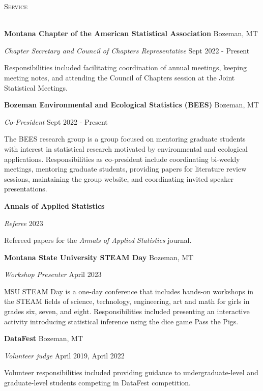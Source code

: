 \documentclass[a4paper]{article}
\newcommand{\lineunder} {
	\vspace*{-8pt} \\
	\hspace*{-18pt} \hrulefill \\
}
\newcommand{\header} [1] {
	{\hspace*{-18pt}\vspace*{6pt} \textcolor{Cerulean}{\textsc{#1}}}
	\vspace*{-6pt} \textcolor{Cerulean}{\lineunder}
}
\begin{document}
\header{Service}

\textbf{Montana Chapter of the American Statistical Association}
\hfill Bozeman, MT

\emph{Chapter Secretary and Council of Chapters Representative}
\hfill Sept 2022 - Present

Responsibilities included facilitating coordination of annual meetings,
keeping meeting notes, and attending the Council of Chapters session at
the Joint Statistical Meetings. \vspace*{2mm}

\textbf{Bozeman Environmental and Ecological Statistics (BEES)}
\hfill Bozeman, MT

\emph{Co-President} \hfill Sept 2022 - Present

The BEES research group is a group focused on mentoring graduate
students with interest in statistical research motivated by
environmental and ecological applications. Responsibilities as
co-president include coordinating bi-weekly meetings, mentoring graduate
students, providing papers for literature review sessions, maintaining
the group website, and coordinating invited speaker presentations.
\vspace*{2mm}

\textbf{Annals of Applied Statistics}

\emph{Referee} \hfill 2023

Refereed papers for the \emph{Annals of Applied Statistics} journal.
\vspace*{2mm}

\textbf{Montana State University STEAM Day} \hfill Bozeman, MT

\emph{Workshop Presenter} \hfill April 2023

MSU STEAM Day is a one-day conference that includes hands-on workshops
in the STEAM fields of science, technology, engineering, art and math
for girls in grades six, seven, and eight. Responsibilities included
presenting an interactive activity introducing statistical inference
using the dice game Pass the Pigs. \vspace*{2mm}

\textbf{DataFest} \hfill Bozeman, MT

\emph{Volunteer judge} \hfill April 2019, April 2022

Volunteer responsibilities included providing guidance to
undergraduate-level and graduate-level students competing in DataFest
competition. \vspace*{2mm}
\end{document}
